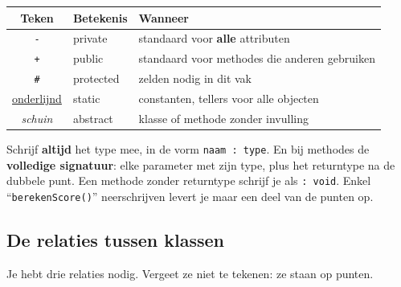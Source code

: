\documentclass[a4paper,11pt]{article}
\begin{document}
\begin{center}
    \begin{tabular}{@{}clp{7.4cm}@{}}
        \toprule
        \textbf{Teken}         & \textbf{Betekenis} & \textbf{Wanneer}                              \\
        \midrule
        \texttt{-}             & private            & standaard voor \textbf{alle} attributen       \\
        \texttt{+}             & public             & standaard voor methodes die anderen gebruiken \\
        \texttt{\#}            & protected          & zelden nodig in dit vak                       \\
        \midrule
        \underline{onderlijnd} & static             & constanten, tellers voor alle objecten        \\
        \textit{schuin}        & abstract           & klasse of methode zonder invulling            \\
        \bottomrule
    \end{tabular}
\end{center}

\begin{warningbox}
    Schrijf \textbf{altijd} het type mee, in de vorm \texttt{naam : type}. En bij
    methodes de \textbf{volledige signatuur}: elke parameter met zijn type, plus het
    returntype na de dubbele punt. Een methode zonder returntype schrijf je als
    \texttt{: void}. Enkel ``\texttt{berekenScore()}'' neerschrijven levert je maar
    een deel van de punten op.
\end{warningbox}

\subsection{De relaties tussen klassen}

Je hebt drie relaties nodig. Vergeet ze niet te tekenen: ze staan op punten.
\end{document}
